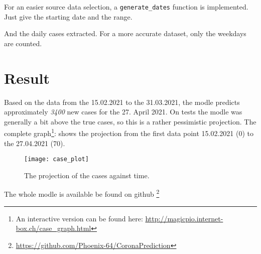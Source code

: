 \documentclass {article}
\begin{document}
For an easier source data selection, a \verb=generate_dates= function is implemented. Just give the starting date and the range.

\newpage
And the daily cases extracted. For a more accurate dataset, only the weekdays are counted.



\section {Result}
Based on the data from the 15.02.2021 to the 31.03.2021, the modle predicts approximately \emph{3400} new cases for the 27. April 2021.
On tests the modle was generally a bit above the true cases, so this is a rather pessimistic projection.
The complete graph\footnote{An interactive version can be found here: \url{http://magicpio.internet-box.ch/case_graph.html}}: shows the projection from the first data point 15.02.2021 (0) to the 27.04.2021 (70).
\begin{figure}[h]
    \centering
    \texttt{[image: case\_plot]}
    \caption {The projection of the cases against time.}
    \label{fig:Cases}
\end{figure}


The whole modle is available be found on github \footnote{\url{https://github.com/Phoenix-64/CoronaPrediction}}
	
\end{document}
